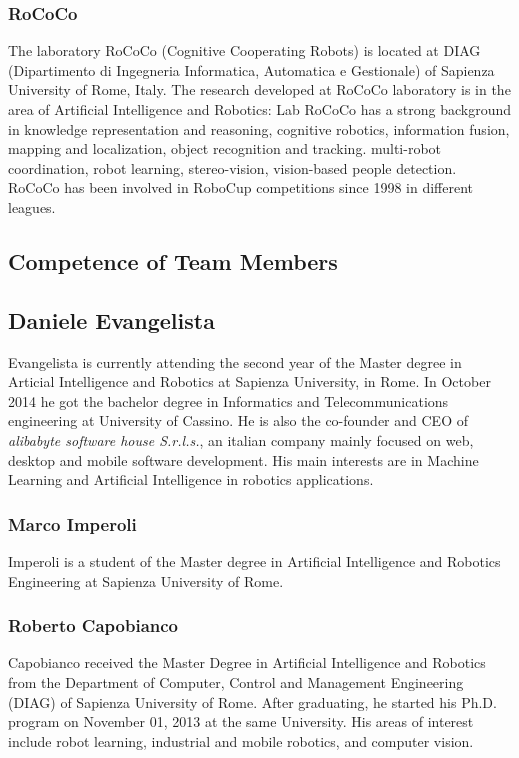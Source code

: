 \documentclass[conference]{IEEEtran}
\begin{document}
\subsubsection{RoCoCo} The laboratory RoCoCo (Cognitive Cooperating Robots) is located at DIAG (Dipartimento di Ingegneria Informatica, Automatica e Gestionale) of Sapienza University of Rome, Italy.
The research developed at RoCoCo laboratory is in the area of Artificial Intelligence and Robotics: Lab RoCoCo has a strong background in knowledge representation and reasoning, cognitive robotics, information fusion, mapping and localization, object recognition and tracking. multi-robot coordination, robot learning, stereo-vision, vision-based people detection. RoCoCo has been involved in RoboCup competitions since 1998 in different leagues.\\

\subsection{Competence of Team Members}

\subsection*{Daniele Evangelista}
Evangelista is currently attending the second year of the Master degree in Articial Intelligence and Robotics at Sapienza University, in Rome. In October 2014 he got the bachelor degree in Informatics and Telecommunications engineering at University of Cassino. He is also the co-founder and CEO of \emph{alibabyte software house S.r.l.s.}, an italian company mainly focused on web, desktop and mobile software development. His main interests are in Machine Learning and Artificial Intelligence in robotics applications.
\subsubsection*{Marco Imperoli}
Imperoli is a student of the Master degree in Artificial Intelligence and Robotics Engineering at Sapienza University of Rome.
\subsubsection*{Roberto Capobianco}
Capobianco received the Master Degree in Artificial Intelligence and Robotics from the Department of Computer, 
Control and Management Engineering (DIAG) of Sapienza University of Rome. 
After graduating, he started his Ph.D. program on November 01, 2013 at the same University. His areas of interest include robot learning, industrial and mobile robotics, and computer vision.
\end{document}
